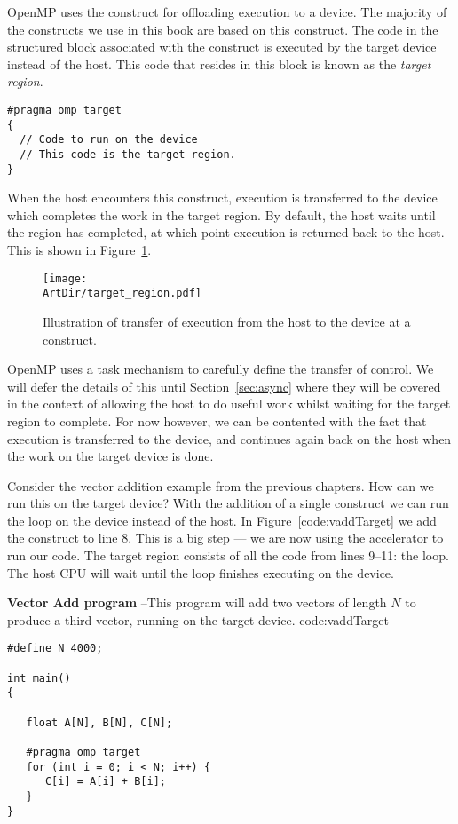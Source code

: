 OpenMP uses the  construct for offloading execution to a device.
The majority of the constructs we use in this book are based on this  construct.
The code in the structured block associated with the  construct is executed by the target device instead of the host.
This code that resides in this block is known as the \emph{target region}.

\begin{verbatim}
#pragma omp target
{
  // Code to run on the device
  // This code is the target region.
}
\end{verbatim}

When the host encounters this  construct, execution is transferred to the device which completes the work in the target region.
By default, the host waits until the region has completed, at which point execution is returned back to the host.
This is shown in Figure~\ref{fig:target_region}.

\begin{figure}[t]
\centerline{\texttt{[image: \\ArtDir/target\_region.pdf]}}
\caption{Illustration of transfer of execution from the host to the device at a  construct.}
\label{fig:target_region}
\end{figure}

OpenMP uses a task mechanism to carefully define the transfer of control.
We will defer the details of this until Section~\ref{sec:async} where they will be covered in the context of allowing the host to do useful work whilst waiting for the target region to complete.
For now however, we can be contented with the fact that execution is transferred to the device, and continues again back on the host when the work on the target device is done.

Consider the vector addition example from the previous chapters.
How can we run this on the target device?
With the addition of a single  construct we can run the loop on the device instead of the host.
In Figure~\ref{code:vaddTarget} we add the construct to line 8.
This is a big step --- we are now using the accelerator to run our code.
The target region consists of all the code from lines 9--11: the  loop.
The host CPU will wait until the loop finishes executing on the device.

\begin{CodeExample}%
{\textbf{Vector Add program} --\small This program will add two vectors of length $N$
to produce a third vector, running on the target device.
}%
{code:vaddTarget}
\begin{lstlisting}
#define N 4000;

int main()
{

   float A[N], B[N], C[N];

   #pragma omp target
   for (int i = 0; i < N; i++) {
      C[i] = A[i] + B[i];
   }
}	  
\end{lstlisting}
\end{CodeExample}

